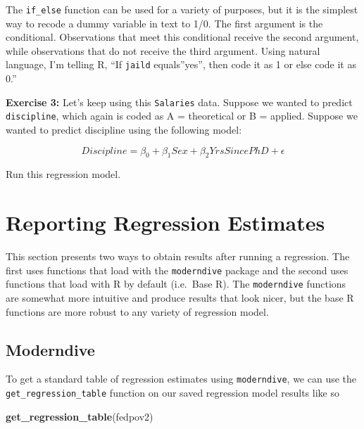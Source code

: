 \documentclass[
]{book}
\makeatletter
\newenvironment{Shaded}{\begin{snugshade}}{\end{snugshade}}
\newcommand{\FunctionTok}[1]{\textcolor[rgb]{0.27,0.27,0.27}{\textbf{#1}}}
\newcommand{\NormalTok}[1]{#1}
\newenvironment{kframe}{%
\medskip{}
\setlength{\fboxsep}{.8em}
 \def\at@end@of@kframe{}%
 \ifinner\ifhmode%
  \def\at@end@of@kframe{\end{minipage}}%
  \begin{minipage}{\columnwidth}%
 \fi\fi%
 \def\FrameCommand##1{\hskip\@totalleftmargin \hskip-\fboxsep
 \colorbox{shadecolor}{##1}\hskip-\fboxsep
     \hskip-\linewidth \hskip-\@totalleftmargin \hskip\columnwidth}%
 \MakeFramed {\advance\hsize-\width
   \@totalleftmargin\z@ \linewidth\hsize
   \@setminipage}}%
 {\par\unskip\endMakeFramed%
 \at@end@of@kframe}
\renewenvironment{Shaded}{\begin{kframe}}{\end{kframe}}
\newenvironment{rmdblock}[1]
  {\begin{shaded*}
  }
  {\end{shaded*}
  }
\newenvironment{learncheck}
  {\begin{rmdblock}{warning}}
  {\end{rmdblock}}
\makeatother
\begin{document}
The \texttt{if\_else} function can be used for a variety of purposes, but it is the simplest way to recode a dummy variable in text to 1/0. The first argument is the conditional. Observations that meet this conditional receive the second argument, while observations that do not receive the third argument. Using natural language, I'm telling R, ``If \texttt{jaild} equals''yes'', then code it as 1 or else code it as 0.''

\begin{learncheck}
\textbf{Exercise 3:} Let's keep using this \texttt{Salaries} data.
Suppose we wanted to predict \texttt{discipline}, which again is coded
as A = theoretical or B = applied. Suppose we wanted to predict
discipline using the following model:

\begin{equation}
Discipline = \beta_0 + \beta_1Sex + \beta_2YrsSincePhD + \epsilon
\end{equation}

Run this regression model.
\end{learncheck}

\hypertarget{reporting-regression-estimates}{%
\section{Reporting Regression Estimates}\label{reporting-regression-estimates}}

This section presents two ways to obtain results after running a regression. The first uses functions that load with the \texttt{moderndive} package and the second uses functions that load with R by default (i.e.~Base R). The \texttt{moderndive} functions are somewhat more intuitive and produce results that look nicer, but the base R functions are more robust to any variety of regression model.

\hypertarget{moderndive}{%
\subsection{Moderndive}\label{moderndive}}

To get a standard table of regression estimates using \texttt{moderndive}, we can use the \texttt{get\_regression\_table} function on our saved regression model results like so

\begin{Shaded}
\begin{Highlighting}[]
\FunctionTok{get\_regression\_table}\NormalTok{(fedpov2)}
\end{Highlighting}
\end{Shaded}
\end{document}
